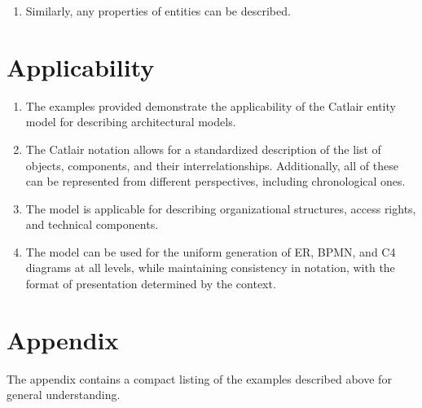 \documentclass[final]{article}
\begin{document}
\begin{enumerate}
\begin{verbatim}
                \end{verbatim}

                \item Similarly, any properties of entities can be described.

            \end{enumerate}


    \section{Applicability}

        \begin{enumerate}

            \item The examples provided demonstrate the applicability of the 
            Catlair entity model for describing architectural models.

            \item The Catlair notation allows for a standardized description of 
            the list of objects, components, and their interrelationships. 
            Additionally, all of these can be represented from different 
            perspectives, including chronological ones.

            \item The model is applicable for describing organizational 
            structures, access rights, and technical components.

            \item The model can be used for the uniform generation of ER, BPMN, 
            and C4 diagrams at all levels, while maintaining consistency in 
            notation, with the format of presentation determined by the context.

        \end{enumerate}


    \section{Appendix}

        The appendix contains a compact listing of the examples described above 
        for general understanding.
\end{document}
